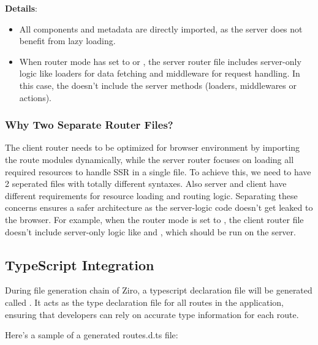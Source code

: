 \textbf{Details}:
\begin{itemize}
  \item All components and metadata are directly imported, as the server does not benefit from lazy loading.
  \item When router mode has set to  or , the server router file includes server-only logic like loaders for data fetching and middleware for request handling. In this case, the  doesn't include the server methods (loaders, middlewares or actions).
\end{itemize}

\subsubsection{Why Two Separate Router Files?}
The client router needs to be optimized for browser environment by importing the route modules dynamically, while the server router focuses on loading all required resources to handle SSR in a single file. To achieve this, we need to have 2 seperated files with totally different syntaxes. Also server and client have different requirements for resource loading and routing logic. Separating these concerns ensures a safer architecture as the server-logic code doesn't get leaked to the browser. For example, when the router mode is set to , the client router file doesn't include server-only logic like  and , which should be run on the server.

\subsection{TypeScript Integration}
During file generation chain of Ziro, a typescript declaration file will be generated called . It acts as the type declaration file for all routes in the application, ensuring that developers can rely on accurate type information for each route.

Here’s a sample of a generated routes.d.ts file:


